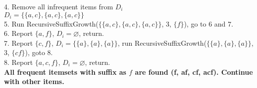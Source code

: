 \documentclass[12pt]{article}
\begin{document}
4. Remove all infrequent items from $D_i$ \\
$D_i = \{\{a, c\}, \{a, c\},\{a, c\}\}$ \\

5. Run RecursiveSuffixGrowth($\{\{a, c\}, \{a, c\},\{a, c\}\}$, 3, $\{f\}$), go to 6 and 7. \\

6. Report $\{a, f\}$, $D_i = \varnothing$, return. \\

7. Report $\{c, f\}$, $D_i = \{\{a\},\{a\},\{a\}\}$, run RecursiveSuffixGrowth($\{\{a\}, \{a\},\{a\}\}$, 3, $\{cf\}$), goto 8. \\

8. Report $\{a, c, f\}$, $D_i = \varnothing$, return. \\

\textbf{All frequent itemsets with suffix as $f$ are found (f, af, cf, acf). Continue with other items.}
\end{document}
